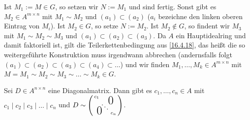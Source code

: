 \documentclass[../../main.tex]{subfiles}
\begin{document}
\begin{cproof}
    \noindent Ist $M_1:=M\in G$, so setzen wir $N:=M_1$ und sind fertig. Sonst gibt es $M_2\in A^{m\times n}$ mit $M_1\sim M_2$ und $(a_1)\subset(a_2)$ ($a_i$ bezeichne den linken oberen Eintrag von $M_i$). Ist $M_2\in G$, so setze $N:=M_2$. Ist $M_2\notin G$, so findent wir $M_3$ mit $M_1\sim M_2\sim M_3$ und $(a_1)\subset(a_2)\subset (a_3)$. Da $A$ ein Hauptidealring und damit faktoriell ist, gilt die Teilerkettenbedingung aus \ref{16.4.18}, das heißt die so weitergeführte Konstruktion muss irgendwann abbrechen (andernsfalls folgt $(a_1)\subset(a_2)\subset(a_3)\subset(a_4)\subset\ldots $) und wir finden $M_1,\ldots ,M_k\in A^{m\times n}$ mit $M=M_1\sim M_2\sim M_3\sim\ldots \sim M_k\in G$.
\end{cproof}

\begin{lem}\label{17.1.10}
    Sei $D\in A^{n\times n}$ eine Diagonalmatrix. Dann gibt es $c_1,\ldots ,c_n\in A$ mit $c_1\mid c_2\mid c_3\mid \ldots \mid c_n$ und $D\sim \left(
        \begin{smallmatrix}
            c_1 & & \llap{$\overset{\blap{\LARGE 0}}{~}$} \\
            & \ddots &\\
            \rlap{\tlap{\LARGE 0}} & & c_n
        \end{smallmatrix}
    \right)$.
\end{lem}
\end{document}

